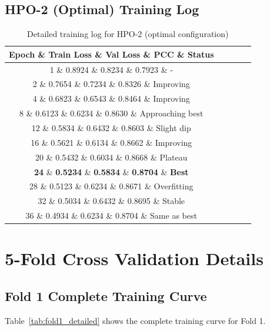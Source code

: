 \documentclass[11pt,a4paper]{article}
\begin{document}
\subsection{HPO-2 (Optimal) Training Log}
\label{subsec:hpo2_log}

\begin{table}[H]
\centering
\caption{Detailed training log for HPO-2 (optimal configuration)}
\label{tab:hpo2_log}
\begin{tabular}{ccccc}
\toprule
\textbf{Epoch} \& \textbf{Train Loss} \& \textbf{Val Loss} \& \textbf{PCC} \& \textbf{Status} \\
\midrule
1 \& 0.8924 \& 0.8234 \& 0.7923 \& - \\
2 \& 0.7654 \& 0.7234 \& 0.8326 \& Improving \\
4 \& 0.6823 \& 0.6543 \& 0.8464 \& Improving \\
8 \& 0.6123 \& 0.6234 \& 0.8630 \& Approaching best \\
12 \& 0.5834 \& 0.6432 \& 0.8603 \& Slight dip \\
16 \& 0.5621 \& 0.6134 \& 0.8662 \& Improving \\
20 \& 0.5432 \& 0.6034 \& 0.8668 \& Plateau \\
\textbf{24} \& \textbf{0.5234} \& \textbf{0.5834} \& \textbf{0.8704} \& \textbf{Best} \\
28 \& 0.5123 \& 0.6234 \& 0.8671 \& Overfitting \\
32 \& 0.5034 \& 0.6432 \& 0.8695 \& Stable \\
36 \& 0.4934 \& 0.6234 \& 0.8704 \& Same as best \\
\bottomrule
\end{tabular}
\end{table}

\section{5-Fold Cross Validation Details}
\label{sec:cv_details}

\subsection{Fold 1 Complete Training Curve}
\label{subsec:fold1_curve}

Table~\ref{tab:fold1_detailed} shows the complete training curve for Fold 1.
\end{document}
